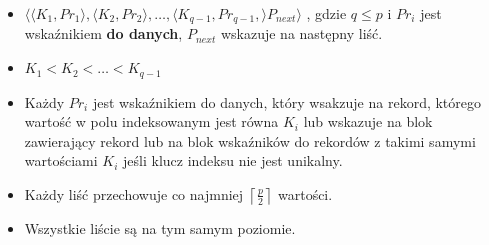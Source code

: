 \begin{itemize}
    \item $\langle\langle K_1, Pr_1 \rangle , \langle K_2, Pr_2 \rangle ,
     \ldots, \langle K_{q-1}, Pr_{q-1}, \rangle P_{next} \rangle$
          , gdzie $q \leqslant p$ i $Pr_i$ jest wskaźnikiem \textbf{do danych},
          $P_{next}$ wskazuje na następny liść.
    \item $K_1 < K_2 < \ldots < K_{q-1}$
    \item Każdy $Pr_i$ jest wskaźnikiem do danych, który wsakzuje na rekord,
          którego wartość w polu indeksowanym jest równa $K_i$ lub wskazuje
          na blok zawierający rekord lub na blok wskaźników do rekordów z
          takimi samymi wartościami $K_i$ jeśli klucz indeksu nie jest
          unikalny.
    \item Każdy liść przechowuje co najmniej
          $\left\lceil \frac{p}{2} \right\rceil$ wartości.
    \item Wszystkie liście są na tym samym poziomie.

\end{itemize}

